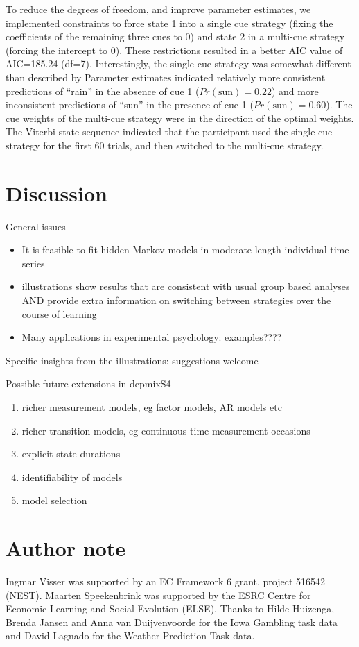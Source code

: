 \documentclass[a4paper,12pt,man,english]{apa} %
\newcommand{\citet}{\citeA}
\begin{document}
To reduce the degrees of freedom, and improve parameter estimates, we
implemented constraints to force state 1 into a single cue strategy
(fixing the coefficients of the remaining three cues to 0) and state 2
in a multi-cue strategy (forcing the intercept to 0).  These
restrictions resulted in a better AIC value of AIC=185.24 (df=7).
Interestingly, the single cue strategy was somewhat different than
described by \citet{Gluck2002}  Parameter estimates indicated relatively
more consistent predictions of ``rain'' in the absence of cue 1
($Pr(\text{sun}) = 0.22$) and more inconsistent predictions of ``sun''
in the presence of cue 1 ($Pr(\text{sun}) = 0.60$).  The cue weights
of the multi-cue strategy were in the direction of the optimal
weights.  The Viterbi state sequence indicated that the participant
used the single cue strategy for the first 60 trials, and then
switched to the multi-cue strategy.


\section{Discussion}

General issues
\begin{itemize}
	\item It is feasible to fit hidden Markov models in moderate length individual time series
	\item illustrations show results that are consistent with usual group based analyses AND 
	provide extra information on switching between strategies over the course of learning
	\item Many applications in experimental psychology: examples????
\end{itemize}

Specific insights from the illustrations: suggestions welcome

Possible future extensions in depmixS4
\begin{enumerate}
	\item richer measurement models, eg factor models, AR models etc
	\item richer transition models, eg continuous time measurement occasions
	\item explicit state durations
	\item identifiability of models
	\item model selection
\end{enumerate}





\section*{Author note}

Ingmar Visser was supported by an EC Framework 6 grant, project 516542
(NEST).  Maarten Speekenbrink was supported by the ESRC Centre for
Economic Learning and Social Evolution (ELSE).  Thanks to Hilde
Huizenga, Brenda Jansen and Anna van Duijvenvoorde for the Iowa
Gambling task data and David Lagnado for the Weather Prediction Task
data.


\end{document}

